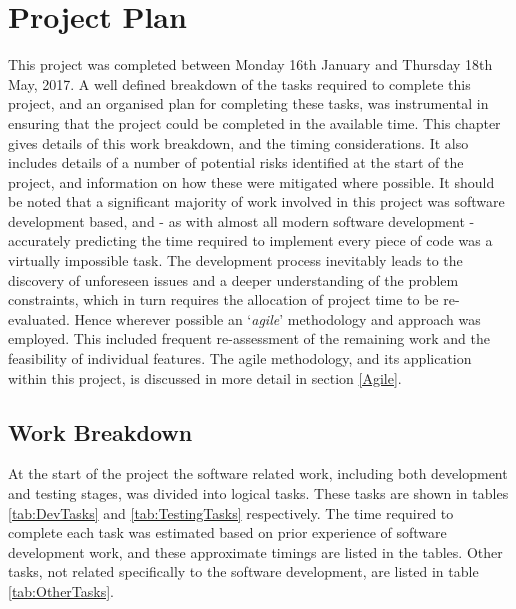 
\chapter[Project Plan]{Project Plan} %

\label{Chapter3} %


This project was completed between Monday 16th January and Thursday 18th May, 2017. A well defined breakdown of the tasks required to complete this project, and an organised plan for completing these tasks, was instrumental in ensuring that the project could be completed in the available time. This chapter gives details of this work breakdown, and the timing considerations. It also includes details of a number of potential risks identified at the start of the project, and information on how these were mitigated where possible. It should be noted that a significant majority of work involved in this project was software development based, and - as with almost all modern software development - accurately predicting the time required to implement every piece of code was a virtually impossible task. The development process inevitably leads to the discovery of unforeseen issues and a deeper understanding of the problem constraints, which in turn requires the allocation of project time to be re-evaluated. Hence wherever possible an `\textit{agile}' methodology and approach was employed. This included frequent re-assessment of the remaining work and the feasibility of individual features. The agile methodology, and its application within this project, is discussed in more detail in section \ref{Agile}.


\section{Work Breakdown}
At the start of the project the software related work, including both development and testing stages, was divided into logical tasks. These tasks are shown in tables \ref{tab:DevTasks} and \ref{tab:TestingTasks} respectively. The time required to complete each task was estimated based on prior experience of software development work, and these approximate timings are listed in the tables. Other tasks, not related specifically to the software development, are listed in table \ref{tab:OtherTasks}.

